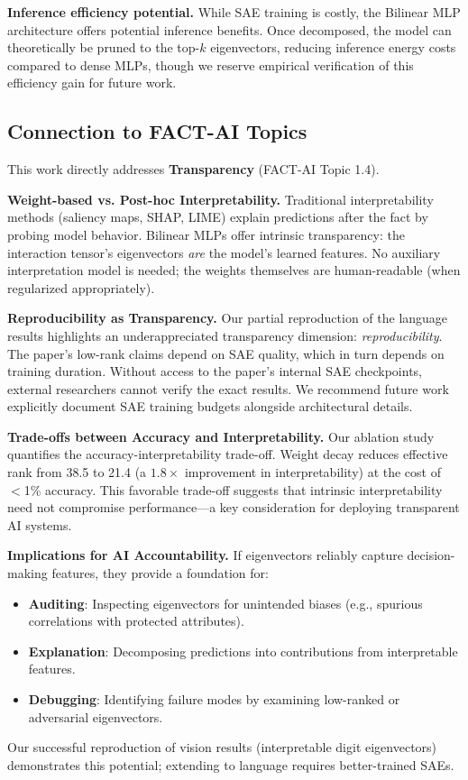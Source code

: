 \textbf{Inference efficiency potential.}
While SAE training is costly, the Bilinear MLP architecture offers potential inference benefits.
Once decomposed, the model can theoretically be pruned to the top-$k$ eigenvectors, reducing inference energy costs compared to dense MLPs, though we reserve empirical verification of this efficiency gain for future work.

\subsection{Connection to FACT-AI Topics}
\label{sec:fact}

This work directly addresses \textbf{Transparency} (FACT-AI Topic 1.4).

\textbf{Weight-based vs. Post-hoc Interpretability.}
Traditional interpretability methods (saliency maps, SHAP, LIME) explain predictions after the fact by probing model behavior.
Bilinear MLPs offer intrinsic transparency: the interaction tensor's eigenvectors \emph{are} the model's learned features.
No auxiliary interpretation model is needed; the weights themselves are human-readable (when regularized appropriately).

\textbf{Reproducibility as Transparency.}
Our partial reproduction of the language results highlights an underappreciated transparency dimension: \emph{reproducibility}.
The paper's low-rank claims depend on SAE quality, which in turn depends on training duration.
Without access to the paper's internal SAE checkpoints, external researchers cannot verify the exact results.
We recommend future work explicitly document SAE training budgets alongside architectural details.

\textbf{Trade-offs between Accuracy and Interpretability.}
Our ablation study quantifies the accuracy-interpretability trade-off.
Weight decay reduces effective rank from 38.5 to 21.4 (a $1.8\times$ improvement in interpretability) at the cost of $<$1\% accuracy.
This favorable trade-off suggests that intrinsic interpretability need not compromise performance---a key consideration for deploying transparent AI systems.

\textbf{Implications for AI Accountability.}
If eigenvectors reliably capture decision-making features, they provide a foundation for:
\begin{itemize}
    \item \textbf{Auditing}: Inspecting eigenvectors for unintended biases (e.g., spurious correlations with protected attributes).
    \item \textbf{Explanation}: Decomposing predictions into contributions from interpretable features.
    \item \textbf{Debugging}: Identifying failure modes by examining low-ranked or adversarial eigenvectors.
\end{itemize}
Our successful reproduction of vision results (interpretable digit eigenvectors) demonstrates this potential; extending to language requires better-trained SAEs.

